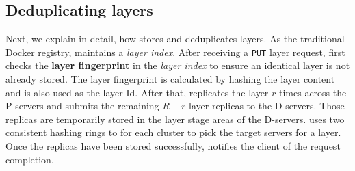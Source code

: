 \subsection{Deduplicating layers}
\label{sec:dedup-desgin}

Next, we explain in detail, how \sysname stores and deduplicates layers.
%
%
As the traditional Docker registry, \sysname maintains a \emph{layer index}.
After receiving a \texttt{PUT} layer request,
\sysname first checks the \textbf{layer fingerprint} in the \emph{layer index} to ensure 
an identical layer is not already stored.
The layer fingerprint is calculated by hashing the layer content 
and is also used as the layer Id.
After that, \sysname replicates the layer $r$ times across the P-servers
and submits the remaining $R-r$ layer replicas to the D-servers. Those replicas are
temporarily stored in the layer stage areas of the D-servers. \sysname uses
two consistent hashing rings to for each cluster to pick the target servers for
a layer. Once the replicas
have been stored successfully, \sysname notifies the client of the request completion.
%

